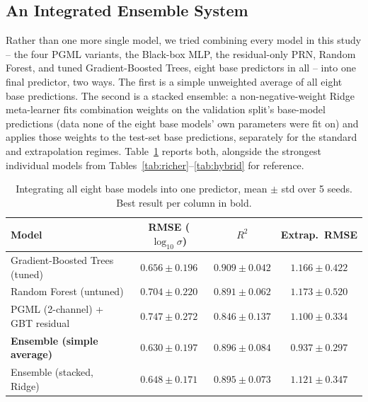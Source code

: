 \documentclass[11pt]{article}
\begin{document}
\subsection{An Integrated Ensemble System}

Rather than one more single model, we tried combining every model in this study -- the four PGML variants, the Black-box MLP, the residual-only PRN, Random Forest, and tuned Gradient-Boosted Trees, eight base predictors in all -- into one final predictor, two ways. The first is a simple unweighted average of all eight base predictions. The second is a stacked ensemble: a non-negative-weight Ridge meta-learner fits combination weights on the validation split's base-model predictions (data none of the eight base models' own parameters were fit on) and applies those weights to the test-set base predictions, separately for the standard and extrapolation regimes. Table~\ref{tab:ensemble} reports both, alongside the strongest individual models from Tables~\ref{tab:richer}--\ref{tab:hybrid} for reference.

\begin{table}[h]
\centering
\caption{Integrating all eight base models into one predictor, mean $\pm$ std over 5 seeds. Best result per column in bold.}
\label{tab:ensemble}
\begin{tabular}{lccc}
\toprule
Model & RMSE ($\log_{10}\sigma$) & $R^2$ & Extrap.\ RMSE \\
\midrule
Gradient-Boosted Trees (tuned)       & $0.656 \pm 0.196$ & $\mathbf{0.909 \pm 0.042}$ & $1.166 \pm 0.422$ \\
Random Forest (untuned)              & $0.704 \pm 0.220$ & $0.891 \pm 0.062$ & $1.173 \pm 0.520$ \\
PGML (2-channel) + GBT residual      & $0.747 \pm 0.272$ & $0.846 \pm 0.137$ & $1.100 \pm 0.334$ \\
\textbf{Ensemble (simple average)}   & $\mathbf{0.630 \pm 0.197}$ & $0.896 \pm 0.084$ & $\mathbf{0.937 \pm 0.297}$ \\
Ensemble (stacked, Ridge)            & $0.648 \pm 0.171$ & $0.895 \pm 0.073$ & $1.121 \pm 0.347$ \\
\bottomrule
\end{tabular}
\end{table}
\end{document}
